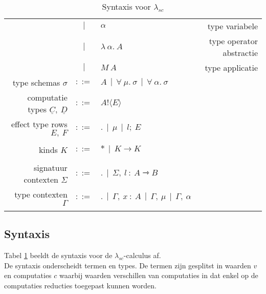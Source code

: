 \begin{table}
\begin{tabular}{|r c l r|}
         & $|$ & $\alpha$ & type variabele \\
         & $|$ & $\lambda \: \alpha . \: A$ & type operator abstractie \\
         & $|$ & $M \: A$ & type applicatie \\
         type schemas $\sigma$ & $::=$ & $A \: \: | \: \: \forall \: \mu . \: \sigma \: \: | \: \: \forall \: \alpha. \: \sigma $ & \\
         computatie types $\underline{C}, \: \underline{D}$ & $::=$ & $A ! \langle E \rangle $ & \\
         effect type rows $E, \: F$ & $::=$ & $. \: \: | \: \: \mu \: \: | \: \: l; \: E $ & \\
         & & & \\
         kinds $K$ & $::=$ & $* \: \: | \: \: K \rightarrow K$ & \\
         & & & \\
         signatuur contexten $\Sigma$ & $::=$ & $. \: \: | \: \: \Sigma , \: l \: : \: A \rightarrowtriangle B$ & \\
         type contexten $\Gamma$ & $::=$ & $. \: \: | \:\: \Gamma, \: x \: : \: A \: \: | \: \: \Gamma , \: \mu \: \: | \: \: \Gamma, \: \alpha $ & \\
         & & & \\
    \hline
    \end{tabular}
    \caption{Syntaxis voor $\lambda_{sc}$}
    \label{fig:syntaxisScoped}
\end{table}

\subsection{Syntaxis}
Tabel \ref{fig:syntaxisScoped} beeldt de syntaxis voor de $\lambda_{sc}$-calculus af. \\

De syntaxis onderscheidt termen en types. De termen zijn gesplitst in waarden $v$ en computaties $c$ waarbij waarden verschillen van computaties in dat enkel op de computaties reducties toegepast kunnen worden.


